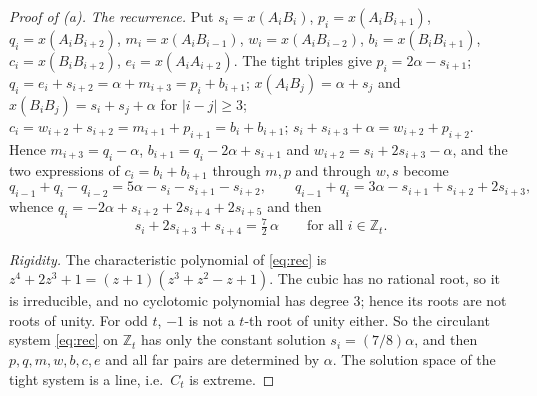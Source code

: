 \documentclass[11pt,a4paper]{article}
\theoremstyle{definition}
\theoremstyle{remark}
\newcommand{\Z}{\mathbb{Z}}
\newcommand{\step}[1]{\smallskip\noindent\emph{#1}}
\begin{document}
\begin{proof}[Proof of (a)]
\step{The recurrence.} Put $s_i = x(A_iB_i)$, $p_i = x(A_iB_{i+1})$, $q_i = x(A_iB_{i+2})$, $m_i = x(A_iB_{i-1})$,
$w_i = x(A_iB_{i-2})$, $b_i = x(B_iB_{i+1})$, $c_i = x(B_iB_{i+2})$, $e_i = x(A_iA_{i+2})$. The tight triples give
$p_i = 2\alpha - s_{i+1}$; $q_i = e_i + s_{i+2} = \alpha + m_{i+3} = p_i + b_{i+1}$; $x(A_iB_j) = \alpha + s_j$ and
$x(B_iB_j) = s_i + s_j + \alpha$ for $|i - j| \ge 3$; $c_i = w_{i+2} + s_{i+2} = m_{i+1} + p_{i+1} = b_i + b_{i+1}$;
$s_i + s_{i+3} + \alpha = w_{i+2} + p_{i+2}$. Hence $m_{i+3} = q_i - \alpha$, $b_{i+1} = q_i - 2\alpha + s_{i+1}$ and
$w_{i+2} = s_i + 2s_{i+3} - \alpha$, and the two expressions of $c_i = b_i + b_{i+1}$ through $m, p$ and through
$w, s$ become
\[
  q_{i-1} + q_i - q_{i-2} = 5\alpha - s_i - s_{i+1} - s_{i+2}, \qquad
  q_{i-1} + q_i = 3\alpha - s_{i+1} + s_{i+2} + 2s_{i+3},
\]
whence $q_i = -2\alpha + s_{i+2} + 2s_{i+4} + 2s_{i+5}$ and then
\begin{equation}\label{eq:rec}\tag{REC}
  s_i + 2 s_{i+3} + s_{i+4} = \tfrac72\,\alpha \qquad\text{for all } i \in \Z_t.
\end{equation}

\step{Rigidity.} The characteristic polynomial of \eqref{eq:rec} is $z^4 + 2z^3 + 1 = (z + 1)(z^3 + z^2 - z + 1)$.
The cubic has no rational root, so it is irreducible, and no cyclotomic polynomial has degree 3; hence its roots are
not roots of unity. For odd $t$, $-1$ is not a $t$-th root of unity either. So the circulant system \eqref{eq:rec}
on $\Z_t$ has only the constant solution $s_i = (7/8)\alpha$, and then $p, q, m, w, b, c, e$ and all far pairs are
determined by $\alpha$. The solution space of the tight system is a line, i.e.\ $C_t$ is extreme.
\end{proof}
\end{document}

